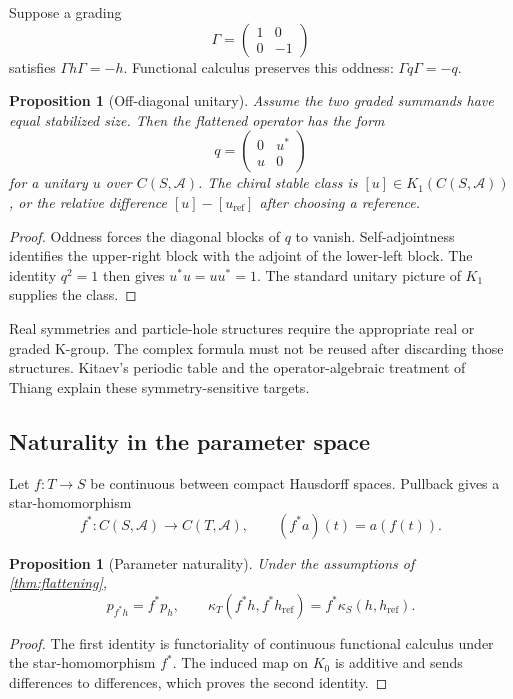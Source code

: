 \documentclass[12pt]{article}
\newtheorem{proposition}[theorem]{Proposition}
\theoremstyle{definition}
\theoremstyle{remark}
\newcommand{\A}{\mathcal A}
\begin{document}
Suppose a grading
\[
\Gamma=
\begin{pmatrix}
1&0\\
0&-1
\end{pmatrix}
\]
satisfies $\Gamma h\Gamma=-h$.
Functional calculus preserves this oddness:
$\Gamma q\Gamma=-q$.

\begin{proposition}[Off-diagonal unitary]
\label{prop:chiral-unitary}
Assume the two graded summands have equal stabilized size.
Then the flattened operator has the form
\[
q=
\begin{pmatrix}
0&u^*\\
u&0
\end{pmatrix}
\]
for a unitary $u$ over $C(S,\A)$.
The chiral stable class is $[u]\in K_1(C(S,\A))$, or the relative difference
$[u]-[u_{\mathrm{ref}}]$ after choosing a reference.
\end{proposition}

\begin{proof}
Oddness forces the diagonal blocks of $q$ to vanish.
Self-adjointness identifies the upper-right block with the adjoint of the
lower-left block.
The identity $q^2=1$ then gives
$u^*u=uu^*=1$.
The standard unitary picture of $K_1$ supplies the class.
\end{proof}

Real symmetries and particle-hole structures require the appropriate real or
graded K-group.
The complex formula must not be reused after discarding those structures.
Kitaev's periodic table \cite{Kitaev2009} and the operator-algebraic treatment
of Thiang \cite{Thiang2016} explain these symmetry-sensitive targets.

\subsection{Naturality in the parameter space}

Let $f:T\to S$ be continuous between compact Hausdorff spaces.
Pullback gives a star-homomorphism
\[
f^*:C(S,\A)\longrightarrow C(T,\A),
\qquad
(f^*a)(t)=a(f(t)).
\]

\begin{proposition}[Parameter naturality]
\label{prop:naturality}
Under the assumptions of \cref{thm:flattening},
\[
p_{f^*h}=f^*p_h,
\qquad
\kappa_T(f^*h,f^*h_{\mathrm{ref}})
=
f^*\kappa_S(h,h_{\mathrm{ref}}).
\]
\end{proposition}

\begin{proof}
The first identity is functoriality of continuous functional calculus under
the star-homomorphism $f^*$.
The induced map on $K_0$ is additive and sends differences to differences,
which proves the second identity.
\end{proof}
\end{document}
